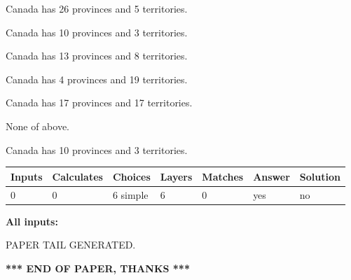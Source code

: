 \documentclass[12pt]{article}
\begin{document}
 
Canada has  26 provinces and  5 territories.
 
 
Canada has 10  provinces and 3 territories.
 
 
Canada has  13 provinces and  8 territories.
 
 
Canada has   4 provinces and  19 territories.
 
 
Canada has  17 provinces and  17 territories.
 
 
 None of above.
 
 
\noindent{}
 
 
Canada has 10  provinces and 3 territories.
 
 
\noindent{}
 
 
   
   
   
   
\noindent\begin{tabular}{|l|l|l|l|l|l|l|}
 \hline
Inputs & Calculates & Choices & Layers & Matches & Answer & Solution \\ \hline
 0  & 
 0  & 
 6
  simple  
  & 
 6  & 
 0  & 
  yes & 
  no 
  \\ \hline
 \end{tabular}
   
   
   
   
\noindent{}
   
   
   
   
\noindent\vspace{0.1in}\hspace{-0.08in} {\textbf{\Large{All inputs: }}}
   
   
   
   
   
   
 \vspace{0.2in}
 
   
   
\vspace{2.0in} PAPER TAIL GENERATED.
   
   
   
   
\vspace{1.0in} 
{\textbf{\large{ *** END OF PAPER, THANKS *** }}} 
   
\end{document}
